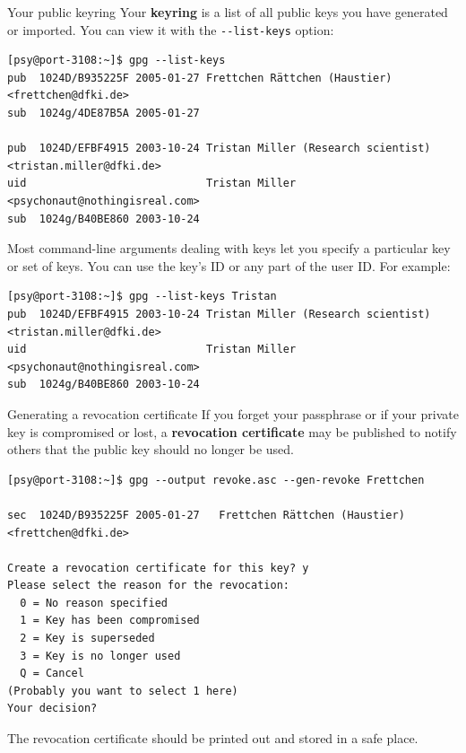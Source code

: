 \documentclass[%
mode=present,%
paper=screen%
]{powerdot}
\newcommand{\clopt}[1]{\texttt{{-}#1}}
\begin{document}
\makeatletter\renewcommand{\verbatim@font}{\tiny\tt}\makeatother
\begin{slide}[method=direct]{Your public keyring}
  Your \textbf{keyring} is a list of all public keys you have
  generated or imported.  You can view it with the
  \clopt{-list-keys} option:\\[1ex]
\begin{verbatim}
[psy@port-3108:~]$ gpg --list-keys
pub  1024D/B935225F 2005-01-27 Frettchen Rättchen (Haustier) <frettchen@dfki.de>
sub  1024g/4DE87B5A 2005-01-27

pub  1024D/EFBF4915 2003-10-24 Tristan Miller (Research scientist) <tristan.miller@dfki.de>
uid                            Tristan Miller <psychonaut@nothingisreal.com>
sub  1024g/B40BE860 2003-10-24

\end{verbatim}%
  Most command-line arguments dealing with keys let you specify a
  particular key or set of keys.  You can use the key's ID or any part
  of the user ID.  For example:\\[1ex]
\begin{verbatim}
[psy@port-3108:~]$ gpg --list-keys Tristan
pub  1024D/EFBF4915 2003-10-24 Tristan Miller (Research scientist) <tristan.miller@dfki.de>
uid                            Tristan Miller <psychonaut@nothingisreal.com>
sub  1024g/B40BE860 2003-10-24

\end{verbatim}%
\end{slide}

\makeatletter\renewcommand{\verbatim@font}{\tiny\tt}\makeatother
\begin{slide}[method=direct]{Generating a revocation certificate}
  If you forget your passphrase or if your private key is compromised
  or lost, a \textbf{revocation certificate} may be published to
  notify others that the public key should no longer be used.\\[1ex]
\begin{verbatim}
[psy@port-3108:~]$ gpg --output revoke.asc --gen-revoke Frettchen

sec  1024D/B935225F 2005-01-27   Frettchen Rättchen (Haustier) <frettchen@dfki.de>

Create a revocation certificate for this key? y
Please select the reason for the revocation:
  0 = No reason specified
  1 = Key has been compromised
  2 = Key is superseded
  3 = Key is no longer used
  Q = Cancel
(Probably you want to select 1 here)
Your decision?

\end{verbatim}%

The revocation certificate should be printed out and stored in a safe
place.
\end{slide}
\end{document}

